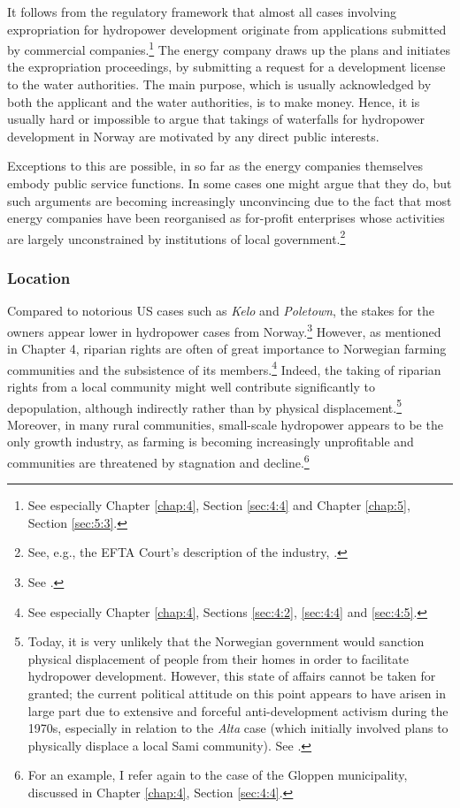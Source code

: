 It follows from the regulatory framework that almost all cases involving expropriation for hydropower development originate from applications submitted by commercial companies.\footnote{See especially Chapter \ref{chap:4}, Section \ref{sec:4:4} and Chapter \ref{chap:5}, Section \ref{sec:5:3}.} The energy company draws up the plans and initiates the expropriation proceedings, by submitting a request for a development license to the water authorities. The main purpose, which is usually acknowledged by both the applicant and the water authorities, is to make money. Hence, it is usually hard or impossible to argue that takings of waterfalls for hydropower development in Norway are motivated by any direct public interests. %

Exceptions to this are possible, in so far as the energy companies themselves embody public service functions. In some cases one might argue that they do, but such arguments are becoming increasingly unconvincing due to the fact that most energy companies have been reorganised as for-profit enterprises whose activities are largely unconstrained by institutions of local government.\footnote{See, e.g., the EFTA Court's description of the industry, \cite{efta06}.}

\subsubsection{Location}\label{sec:5:7:4}

Compared to notorious US cases such as {\it Kelo} and {\it Poletown}, the stakes for the owners appear lower in hydropower cases from Norway.\footnote{See \cite{poletown81,kelo05}.} However, as mentioned in Chapter 4, riparian rights are often of great importance to Norwegian farming communities and the subsistence of its members.\footnote{See especially Chapter \ref{chap:4}, Sections \ref{sec:4:2}, \ref{sec:4:4} and \ref{sec:4:5}.} Indeed, the taking of riparian rights from a local community might well contribute significantly to depopulation, although indirectly rather than by physical displacement.\footnote{Today, it is very unlikely that the Norwegian government would sanction physical displacement of people from their homes in order to facilitate hydropower development. However, this state of affairs cannot be taken for granted; the current political attitude on this point appears to have arisen in large part due to extensive and forceful anti-development activism during the 1970s, especially in relation to the {\it Alta} case (which initially involved plans to physically displace a local Sami community). See \cite{altawiki}.} Moreover, in many rural communities, small-scale hydropower appears to be the only growth industry, as farming is becoming increasingly unprofitable and communities are threatened by stagnation and decline.\footnote{For an example, I refer again to the case of the Gloppen municipality, discussed in Chapter \ref{chap:4}, Section \ref{sec:4:4}.}


